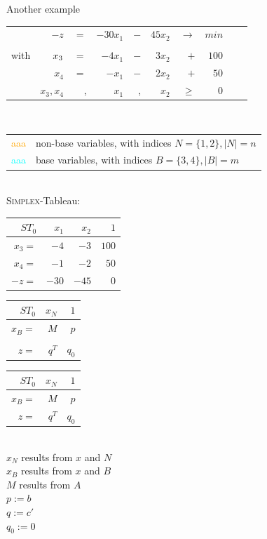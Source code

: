 \documentclass[10pt]{beamer}
\begin{document}
\begin{frame}[fragile]{}
	\begin{exampleblock}{Another example}
	\begin{tabular}{rrrrrrrrrr}
		&$ -z $&$=$& $-30x_1$ &$-$&$45x_2$ &$\rightarrow$& \textbf{$min$}&& \\
		\\
		with&$\cellcolor{cyan}x_3$&$=$&$-4x_1$ &$-$&$3x_2$&$+$&$100$&&\\
		&\cellcolor{cyan}$x_4$&$=$&$-x_1$ & $-$&$2x_2$&$+$&$50$&&\\
		&$x_3,x_4$&,&\cellcolor{orange}$x_1$ &, &\cellcolor{orange}$x_2$&$\geq$&$0$
	\end{tabular} \\
	\vspace{0.5cm}
	\begin{tabular}{ll}
		\cellcolor{orange}\textcolor{orange}{aaa} & non-base variables, with indices $N = \{1,2\}, |N| = n$\\
		\cellcolor{cyan}\textcolor{cyan}{aaa}& base variables, with indices $B = \{3, 4\}, |B| = m$
	\end{tabular}\\

	\vspace{0.5cm}
	\textsc{Simplex}-Tableau: %
	\begingroup
	\def\arraystretch{1.5}
	\begin{tabular}{r|rr|r}
		$ST_0$&$x_1$&$x_2$&$1$\\
		\hline
		$x_3=$&$-4$&$-3$&$100$\\
		$x_4=$&$-1$&$-2$&$50$\\
		\hline
		$-z=$&$-30$&$-45$&$0$
	\end{tabular}
	\endgroup
	\begingroup
	\def\arraystretch{1.5}
	\begin{tabular}{r|r|r}
		$ST_0$&$x_N$&$1$\\
		\hline
		$x_B=$&$M$&$p$\\
		&&\\
		\hline
		$z=$&$q^T$&$q_0$
	\end{tabular}
	\endgroup
	\end{exampleblock}
\end{frame}

\begin{frame}{}
	\begingroup
	\def\arraystretch{1.5}
	\begin{tabular}{r|r|r}
		$ST_0$&$x_N$&$1$\\
		\hline
		$x_B=$&$M$&$p$\\
		\hline
		$z=$&$q^T$&$q_0$
	\end{tabular}
	\endgroup \\
	\vspace{0.25cm}
	$ x_N $ results from $ x $ and $ N $ \\
	$ x_B $ results from  $ x $ and $ B $ \\ 
	$M$ results from $A$ \\
	$p:=b$ \\
	$ q := c' $\\
	$ q_0:=0$ \\
	\vspace{0.25cm}
\end{frame}
\end{document}
